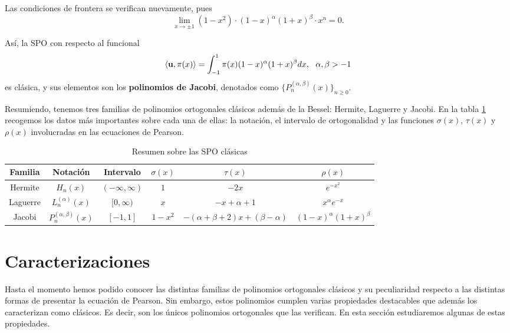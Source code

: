 Las condiciones de frontera se verifican nuevamente, pues $$\displaystyle\lim_{x\rightarrow \pm 1} (1-x^2)\cdot (1-x)^{\alpha}(1+x)^{\beta}\cdot x^n = 0.$$

Así, la SPO con respecto al funcional
\begin{equation}
    \label{eq:func-jacobi}
    \left\langle \mathbf{u} , \pi(x) \right\rangle = \int_{-1}^1 \pi(x)(1-x)^{\alpha}(1+x)^{\beta}dx, \ \ \alpha,\beta > -1
\end{equation}
es clásica, y sus elementos son los \textbf{polinomios de Jacobi}, denotados como $\{P_n^{(\alpha,\beta)}(x)\}_{n\geq 0}$.

Resumiendo, tenemos tres familias de polinomios ortogonales clásicos además de la Bessel: Hermite, Laguerre y Jacobi. En la tabla \ref{tab:SPO-clasicas} recogemos los datos más importantes sobre cada una de ellas: la notación, el intervalo de ortogonalidad y las funciones $\sigma(x)$, $\tau(x)$ y $\rho(x)$ involucradas en las ecuaciones de Pearson.

\begin{table}[h]
    \centering
    \begin{tabular}{cccccc}
    \hline
    \textbf{Familia} & \textbf{Notación}         & \textbf{Intervalo} & \textbf{$\sigma(x)$} & \textbf{$\tau(x)$}                  & \textbf{$\rho(x)$}            \\ \hline\hline
    Hermite                        & $H_n(x)$                 & $(-\infty,\infty)$ & $1$                  & $-2x$                               & $e^{-x^2}$                    \\ \hline
    Laguerre                       & $L_n^{(\alpha)}(x)$       & $[0,\infty)$       & $x$                  & $-x+\alpha+1$                       & $x^{\alpha} e^{-x}$           \\ \hline
    Jacobi                         & $P_n^{(\alpha,\beta)}(x)$ & $[-1,1]$           & $1-x^2$              & $-(\alpha+\beta+2)x+(\beta-\alpha)$ & $(1-x)^{\alpha}(1+x)^{\beta}$ \\ \hline
    \end{tabular}
    \caption{Resumen sobre las SPO clásicas}
    \label{tab:SPO-clasicas}
\end{table}

\section{Caracterizaciones}
\label{section:caracterizaciones}

Hasta el momento hemos podido conocer las distintas familias de polinomios ortogonales clásicos y su peculiaridad respecto a las distintas formas de presentar la ecuación de Pearson. Sin embargo, estos polinomios cumplen varias propiedades destacables que además los caracterizan como clásicos. Es decir, son los únicos polinomios ortogonales que las verifican. En esta sección estudiaremos algunas de estas propiedades.

